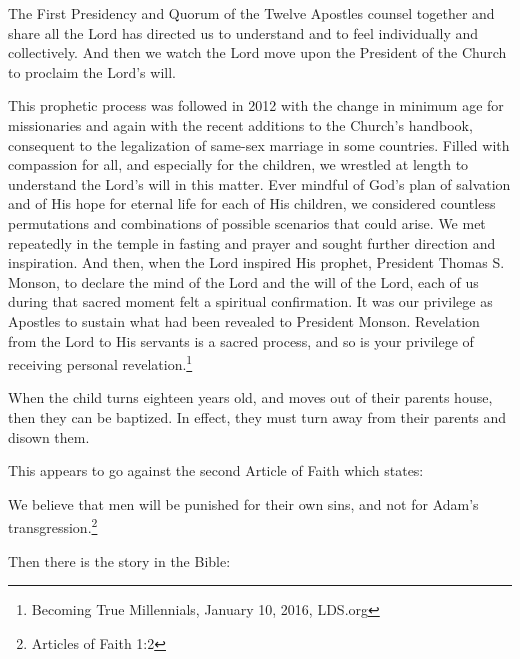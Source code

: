 \begin{displayquote}
The First Presidency and Quorum of the Twelve Apostles counsel together and share all 
the Lord has directed us to understand and to feel individually and collectively. 
And then we watch the Lord move upon the President of the Church to proclaim the 
Lord's will.

This prophetic process was followed in 2012 with the change in minimum age for 
missionaries and again with the recent additions to the Church’s handbook, consequent 
to the legalization of same-sex marriage in some countries. Filled with compassion 
for all, and especially for the children, we wrestled at length to understand the 
Lord's will in this matter. Ever mindful of God’s plan of salvation and of His hope 
for eternal life for each of His children, we considered countless permutations and 
combinations of possible scenarios that could arise. We met repeatedly in the temple 
in fasting and prayer and sought further direction and inspiration. And then, when 
the Lord inspired His prophet, President Thomas S. Monson, to declare the mind of 
the Lord and the will of the Lord, each of us during that sacred moment felt a 
spiritual confirmation. It was our privilege as Apostles to sustain what had been 
revealed to President Monson. Revelation from the Lord to His servants is a sacred 
process, and so is your privilege of receiving personal revelation.\footnote{
Becoming True Millennials, January 10, 2016, LDS.org
}
\end{displayquote}

When the child turns eighteen years old, and moves out of their parents house, then
they can be baptized. In effect, they must turn away from their parents and disown
them.

This appears to go against the second Article of Faith which states:

\begin{displayquote}
We believe that men will be punished for their own sins, and not for Adam's 
transgression.\footnote{Articles of Faith 1:2}
\end{displayquote}

Then there is the story in the Bible:

